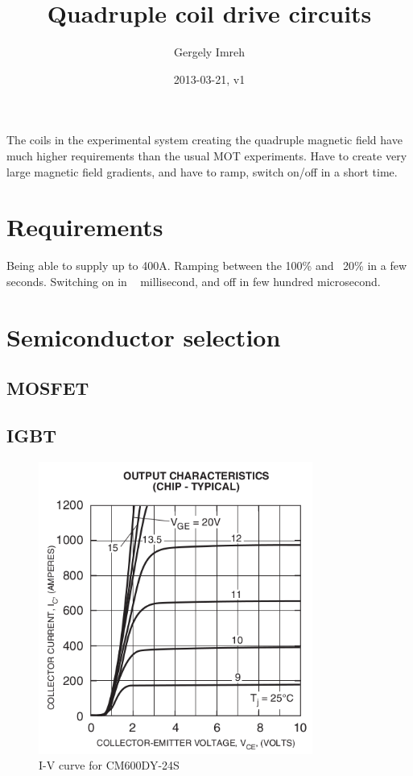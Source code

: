\documentclass[12pt,a4paper]{article}
\author{Gergely Imreh}
\title{Quadruple coil drive circuits}
\date{2013-03-21, v1}
\begin{document}
\maketitle

The coils in the experimental system creating the quadruple magnetic field have much higher requirements than the usual MOT experiments. Have to create very large magnetic field gradients, and have to ramp, switch on/off in a short time.

\tableofcontents

\section{Requirements}

Being able to supply up to 400A. Ramping between the 100\% and ~20\% in a few seconds. Switching on in ~ millisecond, and off in few hundred microsecond.


\section{Semiconductor selection}

\subsection{MOSFET}

\subsection{IGBT}

\begin{figure}[ht!]
\centering
\includegraphics[width=90mm]{CM600DY-24S_I_V.png}
\caption{I-V curve for CM600DY-24S}
\label{fig:cm600dy}
\end{figure}
\end{document}
